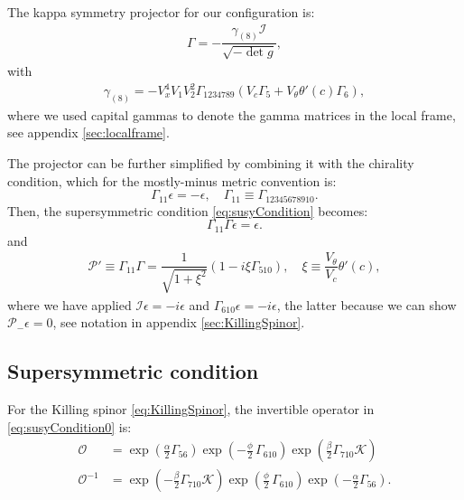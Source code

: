 The kappa symmetry projector for our configuration is:
\begin{align}
\Gamma = - \dfrac{ \gamma_{(8)} \mathcal{I} }{\sqrt{-\det g}},
\end{align}
with
\begin{align}
 \gamma_{(8)} = - V_x^4 V_1 V_2^2 \Gamma_{1 2 3 4 7 8 9}( V_c \Gamma_5 +  V_{\theta} \theta'(c) \Gamma_6), 
\end{align}
where we used capital gammas to denote the gamma matrices in the local frame, see appendix \ref{sec:localframe}.

The projector can be further simplified by combining it with the chirality condition, which for the mostly-minus metric convention is: 
\begin{equation}
 \Gamma_{11} \epsilon = -\epsilon, \quad 
 \Gamma_{11} \equiv \Gamma_{12345678910}.
\end{equation}
Then, the supersymmetric condition \eqref{eq:susyCondition} becomes:
\begin{equation}
 \Gamma_{11} \Gamma \epsilon = \epsilon.
\end{equation}
and 
\begin{align} \label{eq:newProjector}
  \mathcal{P}' \equiv \Gamma_{11} \Gamma  = \dfrac{1}{\sqrt{1+\xi^2}}(1- i \xi  \Gamma_{510}), \quad 
   \xi \equiv  \dfrac{V_\theta}{V_c} \theta'(c),
\end{align}
where we have applied $\mathcal{I} \epsilon = -i\epsilon$ and $\Gamma_{610} \epsilon = -i \epsilon$, the latter because we can show $\mathcal{P}_- \epsilon =0$, see notation in appendix \ref{sec:KillingSpinor}.


\subsection{Supersymmetric condition}

For the Killing spinor \eqref{eq:KillingSpinor}, the invertible operator in \eqref{eq:susyCondition0} is:
\begin{align}
 \mathcal{O} &= \exp{\left(\frac{\alpha}{2}\Gamma_{56} \right)} \exp{\left(-\frac{\phi}{2}\, \Gamma_{610} \right)} \exp{\left(\frac{\beta}{2}\Gamma_{710} \mathcal{K} \right)} \\
 \mathcal{O}^{-1} &=  \exp{\left(-\frac{\beta}{2}\Gamma_{710} \mathcal{K} \right)} 
 \exp{\left(\frac{\phi}{2}\, \Gamma_{610} \right)} 
 \exp{\left(-\frac{\alpha}{2}\Gamma_{56} \right)}.
\end{align}


